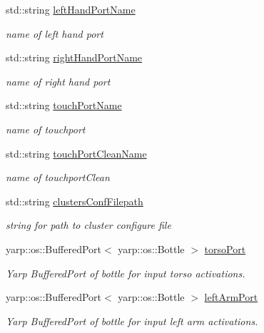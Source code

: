 \begin{DoxyCompactItemize}
std\+::string \hyperlink{group__touchDetector_a012e5f95cfbf2494430c5f1aaa60ad20}{left\+Hand\+Port\+Name}
\begin{DoxyCompactList}\small\item\em name of left hand port \end{DoxyCompactList}\item 
std\+::string \hyperlink{group__touchDetector_ac32ed48b960b2370acee3388df631c79}{right\+Hand\+Port\+Name}
\begin{DoxyCompactList}\small\item\em name of right hand port \end{DoxyCompactList}\item 
std\+::string \hyperlink{group__touchDetector_ab0eb1712b7c3a8c0d8c9b89fb42a2b60}{touch\+Port\+Name}
\begin{DoxyCompactList}\small\item\em name of touchport \end{DoxyCompactList}\item 
std\+::string \hyperlink{group__touchDetector_a8abc1c42a1824678d6d496ce7a211f03}{touch\+Port\+Clean\+Name}
\begin{DoxyCompactList}\small\item\em name of touchport\+Clean \end{DoxyCompactList}\item 
std\+::string \hyperlink{group__touchDetector_ab6acec6890dac5d002a1c81e088c9e10}{clusters\+Conf\+Filepath}
\begin{DoxyCompactList}\small\item\em string for path to cluster configure file \end{DoxyCompactList}\item 
yarp\+::os\+::\+Buffered\+Port$<$ yarp\+::os\+::\+Bottle $>$ \hyperlink{group__touchDetector_aeecd6f5796dd35d24c045237358b0d18}{torso\+Port}
\begin{DoxyCompactList}\small\item\em Yarp Buffered\+Port of bottle for input torso activations. \end{DoxyCompactList}\item 
yarp\+::os\+::\+Buffered\+Port$<$ yarp\+::os\+::\+Bottle $>$ \hyperlink{group__touchDetector_a75b343ad7b457e3b1898df99e0da9b5e}{left\+Arm\+Port}
\begin{DoxyCompactList}\small\item\em Yarp Buffered\+Port of bottle for input left arm activations. \end{DoxyCompactList}\item 

\end{DoxyCompactItemize}
